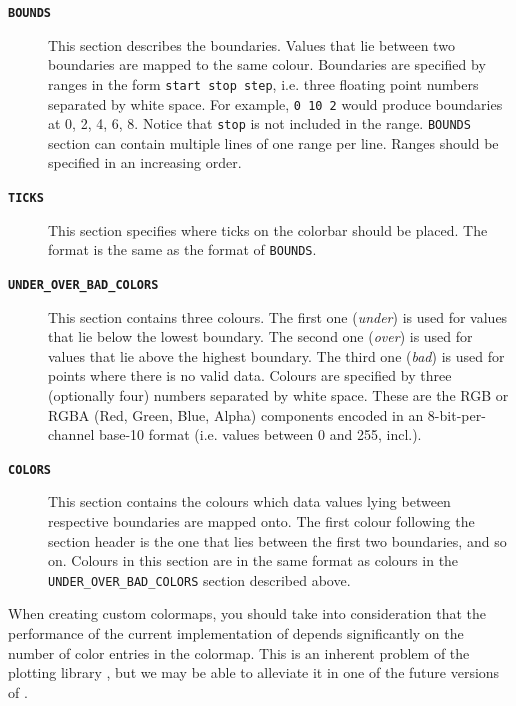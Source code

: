 \begin{description}

\item[\textbf{\texttt{BOUNDS}}] This section describes the boundaries. Values
that lie between two boundaries are mapped to the same colour. Boundaries are
specified by ranges in the form \texttt{start stop step}, i.e. three floating
point numbers separated by white space. For example, \texttt{0 10 2} would
produce boundaries at 0, 2, 4, 6, 8. Notice that \texttt{stop} is not included
in the range. \texttt{BOUNDS} section can contain multiple lines of one range
per line. Ranges should be specified in an increasing order.

\item[\textbf{\texttt{TICKS}}] This section specifies where ticks on the
colorbar should be placed. The format is the same as the format of
\texttt{BOUNDS}.

\item[\textbf{\texttt{UNDER\_OVER\_BAD\_COLORS}}] This section contains three
colours. The first one (\textit{under}) is used for values that lie below the lowest
boundary. The second one (\textit{over}) is used for values that lie above the
highest boundary. The third one (\textit{bad}) is used for points where there is no valid
data. Colours are specified by three (optionally four) numbers separated by
white space. These are the RGB or RGBA (Red, Green, Blue, Alpha) components encoded in an 8-bit-per-channel
base-10 format (i.e. values between 0 and 255, incl.).

\item[\textbf{\texttt{COLORS}}] This section contains the colours which data
values
lying between respective boundaries are mapped onto. The first colour
following the section header is the one that lies between the first two
boundaries, and so on. Colours in this section are in the same format as colours
in the \texttt{UNDER\_OVER\_BAD\_COLORS} section described above.

\end{description}

\noindent When creating custom colormaps, you should take into consideration
that the performance of the current implementation of \ccplot depends
significantly on the number of color entries in the colormap. This is an
inherent problem of the plotting library , but we may be
able to
alleviate it in one of the future versions of \ccplot.

